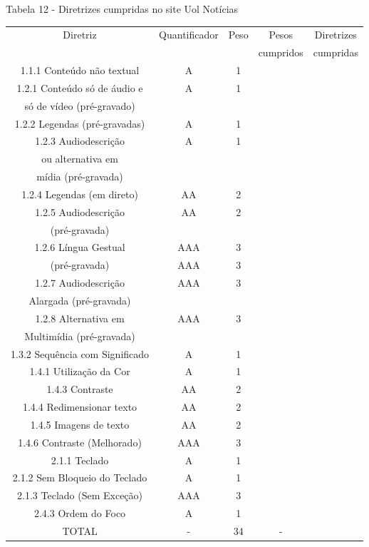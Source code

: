 \documentclass[a4paper]{article}
\begin{document}
\begin{titlepage}
Tabela 12 - Diretrizes cumpridas no site Uol Notícias\\[-1cm]
\begin{center}
	\fontsize{8pt}{8pt}\selectfont	
	\begin{longtable}{|c|c|c|c|c|}
		\hline
		Diretriz & Quantificador & Peso & Pesos & Diretrizes\\
		& & & cumpridos & cumpridas\\
		\hline
		1.1.1 Conteúdo não textual & A & 1 & & \\
		\hline
		1.2.1 Conteúdo só de áudio e & A & 1 & & \\
		só de vídeo (pré-gravado) & & & & \\
		\hline
		1.2.2 Legendas (pré-gravadas) & A & 1 & & \\
		\hline
		1.2.3 Audiodescrição & A & 1 & & \\
		ou alternativa em & & & & \\
		mídia (pré-gravada) & & & & \\
		\hline
		1.2.4 Legendas (em direto) & AA & 2 & & \\
		\hline
		1.2.5 Audiodescrição & AA & 2 & & \\
		(pré-gravada) & & & & \\
		\hline
		1.2.6 Língua Gestual & AAA & 3 & & \\
		(pré-gravada) & AAA & 3 & & \\
		\hline
		1.2.7 Audiodescrição & AAA & 3 & & \\
		Alargada (pré-gravada) & & & & \\
		\hline
		1.2.8 Alternativa em & AAA & 3 & & \\
		Multimídia (pré-gravada) & & & & \\
		\hline
		1.3.2 Sequência com Significado & A & 1 & & \\
		\hline
		1.4.1 Utilização da Cor & A & 1 & & \\
		\hline
		1.4.3 Contraste & AA & 2 & & \\
		\hline
		1.4.4 Redimensionar texto & AA & 2 & & \\
		\hline
		1.4.5 Imagens de texto & AA & 2 & & \\
		\hline
		1.4.6 Contraste (Melhorado) & AAA & 3 & & \\
		\hline
		2.1.1 Teclado & A & 1 & & \\
		\hline
		2.1.2 Sem Bloqueio do Teclado & A & 1 & & \\
		\hline
		2.1.3 Teclado (Sem Exceção) & AAA & 3 & & \\
		\hline
		2.4.3 Ordem do Foco & A & 1 & & \\
		\hline
		TOTAL & - & 34 & - & \\
		\hline
	\end{longtable}
\end{center}


\end{titlepage}
\end{document}
